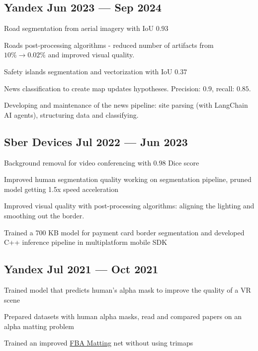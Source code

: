 \subsection{Yandex \hfill Jun 2023 --- Sep 2024}
\begin{zitemize}
\item[$\rightarrow$] Road segmentation from aerial imagery with IoU $0.93$
\item Roads post-processing algorithms - reduced number of artifacts from $10\% \to 0.02\%$ and improved visual quality.
\item Safety islands segmentation and vectorization with IoU $0.37$

\item[$\rightarrow$] News classification to create map updates hypotheses. Precision: $0.9$, recall: $0.85$.
\item Developing and maintenance of the news pipeline: site parsing (with LangChain AI agents), structuring data and classifying. 
\end{zitemize}

\subsection{Sber Devices \hfill Jul 2022 --- Jun 2023}
\begin{zitemize}
\item[$\rightarrow$] Background removal for video conferencing with $0.98$ Dice score
\item Improved human segmentation quality working on segmentation pipeline, pruned model getting 1.5x speed acceleration
\item Improved visual quality with post-processing algorithms: aligning the lighting and smoothing out the border.
\item[$\rightarrow$] Trained a 700 KB model for payment card border segmentation and developed C++ inference pipeline in multiplatform mobile SDK
\end{zitemize}



\subsection{Yandex \hfill Jul 2021 --- Oct 2021}
\begin{zitemize}
\item[$\rightarrow$] Trained model that predicts human's alpha mask to improve the quality of a VR scene
\item Prepared datasets with human alpha masks, read and compared papers on an alpha matting problem
\item Trained an improved \href{https://arxiv.org/pdf/2003.07711v1.pdf}{FBA Matting} net without using trimaps
\end{zitemize}

